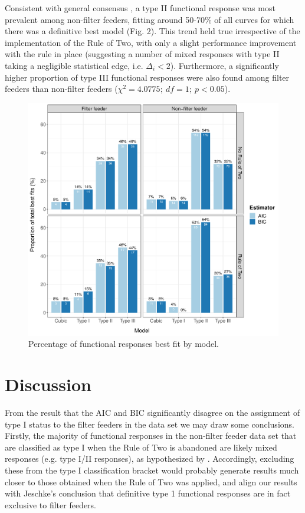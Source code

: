 \documentclass[11pt]{article}
\begin{document}
    Consistent with general consensus \citep{hassell1976components, begon1996ecology}, a type II functional response was most prevalent among non-filter feeders, fitting around 50-70\% of all curves for which there was a definitive best model (Fig. 2). This trend held true irrespective of the implementation of the Rule of Two, with only a slight performance improvement with the rule in place (suggesting a number of mixed responses with type II taking a negligible statistical edge, i.e. $\Delta_i<2$). 
    Furthermore, a significantly higher proportion of type III functional responses were also found among filter feeders than non-filter feeders ($\chi^2=4.0775;\:df=1;\:p<0.05$). 
    
        
    \begin{figure}[t!]
	    \centering\includegraphics[width=1\textwidth]{ModelComparisonBar.pdf}
	    \caption{Percentage of functional responses best fit by model.}
    \end{figure}
   
    
    \section{Discussion}

    From the result that the AIC and BIC significantly disagree on the assignment of type I status to the filter feeders in the data set we may draw some conclusions. Firstly, the majority of functional responses in the non-filter feeder data set that are classified as type I when the Rule of Two is abandoned are likely mixed responses (e.g. type I/II responses), as hypothesized by \citet[p.341]{jeschke2004consumer}. Accordingly, excluding these from the type I classification bracket would probably generate results much closer to those obtained when the Rule of Two was applied, and align our results with Jeschke's conclusion that definitive type 1 functional responses are in fact exclusive to filter feeders.
    
\end{document}
